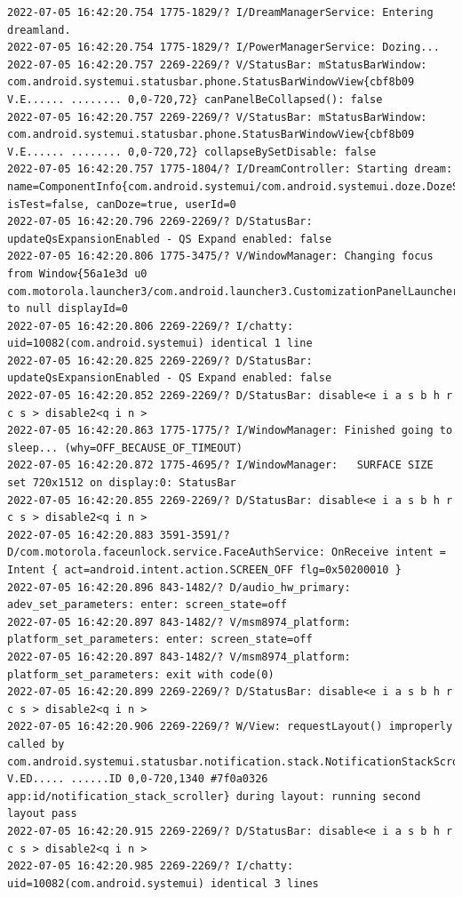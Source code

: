 \documentclass[a4paper,12pt]{book}
\begin{document}
\begin{lstlisting}
2022-07-05 16:42:20.754 1775-1829/? I/DreamManagerService: Entering dreamland.
2022-07-05 16:42:20.754 1775-1829/? I/PowerManagerService: Dozing...
2022-07-05 16:42:20.757 2269-2269/? V/StatusBar: mStatusBarWindow: com.android.systemui.statusbar.phone.StatusBarWindowView{cbf8b09 V.E...... ........ 0,0-720,72} canPanelBeCollapsed(): false
2022-07-05 16:42:20.757 2269-2269/? V/StatusBar: mStatusBarWindow: com.android.systemui.statusbar.phone.StatusBarWindowView{cbf8b09 V.E...... ........ 0,0-720,72} collapseBySetDisable: false
2022-07-05 16:42:20.757 1775-1804/? I/DreamController: Starting dream: name=ComponentInfo{com.android.systemui/com.android.systemui.doze.DozeService}, isTest=false, canDoze=true, userId=0
2022-07-05 16:42:20.796 2269-2269/? D/StatusBar: updateQsExpansionEnabled - QS Expand enabled: false
2022-07-05 16:42:20.806 1775-3475/? V/WindowManager: Changing focus from Window{56a1e3d u0 com.motorola.launcher3/com.android.launcher3.CustomizationPanelLauncher} to null displayId=0
2022-07-05 16:42:20.806 2269-2269/? I/chatty: uid=10082(com.android.systemui) identical 1 line
2022-07-05 16:42:20.825 2269-2269/? D/StatusBar: updateQsExpansionEnabled - QS Expand enabled: false
2022-07-05 16:42:20.852 2269-2269/? D/StatusBar: disable<e i a s b h r c s > disable2<q i n >
2022-07-05 16:42:20.863 1775-1775/? I/WindowManager: Finished going to sleep... (why=OFF_BECAUSE_OF_TIMEOUT)
2022-07-05 16:42:20.872 1775-4695/? I/WindowManager:   SURFACE SIZE set 720x1512 on display:0: StatusBar
2022-07-05 16:42:20.855 2269-2269/? D/StatusBar: disable<e i a s b h r c s > disable2<q i n >
2022-07-05 16:42:20.883 3591-3591/? D/com.motorola.faceunlock.service.FaceAuthService: OnReceive intent = Intent { act=android.intent.action.SCREEN_OFF flg=0x50200010 }
2022-07-05 16:42:20.896 843-1482/? D/audio_hw_primary: adev_set_parameters: enter: screen_state=off
2022-07-05 16:42:20.897 843-1482/? V/msm8974_platform: platform_set_parameters: enter: screen_state=off
2022-07-05 16:42:20.897 843-1482/? V/msm8974_platform: platform_set_parameters: exit with code(0)
2022-07-05 16:42:20.899 2269-2269/? D/StatusBar: disable<e i a s b h r c s > disable2<q i n >
2022-07-05 16:42:20.906 2269-2269/? W/View: requestLayout() improperly called by com.android.systemui.statusbar.notification.stack.NotificationStackScrollLayout{cc84c7f V.ED..... ......ID 0,0-720,1340 #7f0a0326 app:id/notification_stack_scroller} during layout: running second layout pass
2022-07-05 16:42:20.915 2269-2269/? D/StatusBar: disable<e i a s b h r c s > disable2<q i n >
2022-07-05 16:42:20.985 2269-2269/? I/chatty: uid=10082(com.android.systemui) identical 3 lines

\end{lstlisting}
\end{document}
